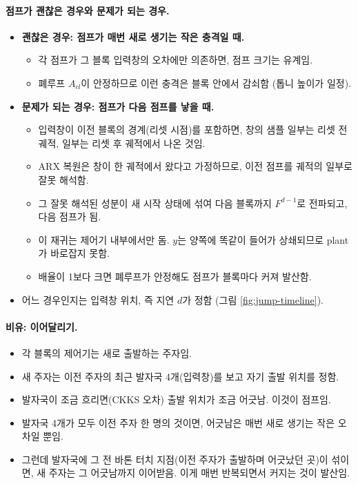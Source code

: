 \documentclass[11pt,a4paper]{article}
\begin{document}
\paragraph{점프가 괜찮은 경우와 문제가 되는 경우.}
\begin{itemize}
\item \textbf{괜찮은 경우: 점프가 매번 새로 생기는 작은 충격일 때.}
  \begin{itemize}
  \item 각 점프가 그 블록 입력창의 오차에만 의존하면, 점프 크기는 유계임.
  \item 폐루프 $A_{cl}$이 안정하므로 이런 충격은 블록 안에서 감쇠함 (톱니 높이가 일정).
  \end{itemize}
\item \textbf{문제가 되는 경우: 점프가 다음 점프를 낳을 때.}
  \begin{itemize}
  \item 입력창이 이전 블록의 경계(리셋 시점)를 포함하면, 창의 샘플 일부는 리셋 전 궤적, 일부는 리셋 후 궤적에서 나온 것임.
  \item ARX 복원은 창이 한 궤적에서 왔다고 가정하므로, 이전 점프를 궤적의 일부로 잘못 해석함.
  \item 그 잘못 해석된 성분이 새 시작 상태에 섞여 다음 블록까지 $F^{d-1}$로 전파되고, 다음 점프가 됨.
  \item 이 재귀는 제어기 내부에서만 돔. $y$는 양쪽에 똑같이 들어가 상쇄되므로 plant가 바로잡지 못함.
  \item 배율이 1보다 크면 폐루프가 안정해도 점프가 블록마다 커져 발산함.
  \end{itemize}
\item 어느 경우인지는 입력창 위치, 즉 지연 $d$가 정함 (그림 \ref{fig:jump-timeline}).
\end{itemize}

\paragraph{비유: 이어달리기.}
\begin{itemize}
\item 각 블록의 제어기는 새로 출발하는 주자임.
\item 새 주자는 이전 주자의 최근 발자국 4개(입력창)를 보고 자기 출발 위치를 정함.
\item 발자국이 조금 흐리면(CKKS 오차) 출발 위치가 조금 어긋남. 이것이 점프임.
\item 발자국 4개가 모두 이전 주자 한 명의 것이면, 어긋남은 매번 새로 생기는 작은 오차일 뿐임.
\item 그런데 발자국에 그 전 바톤 터치 지점(이전 주자가 출발하며 어긋났던 곳)이 섞이면, 새 주자는 그 어긋남까지 이어받음.
      이게 매번 반복되면서 커지는 것이 발산임.
\end{itemize}
\end{document}
